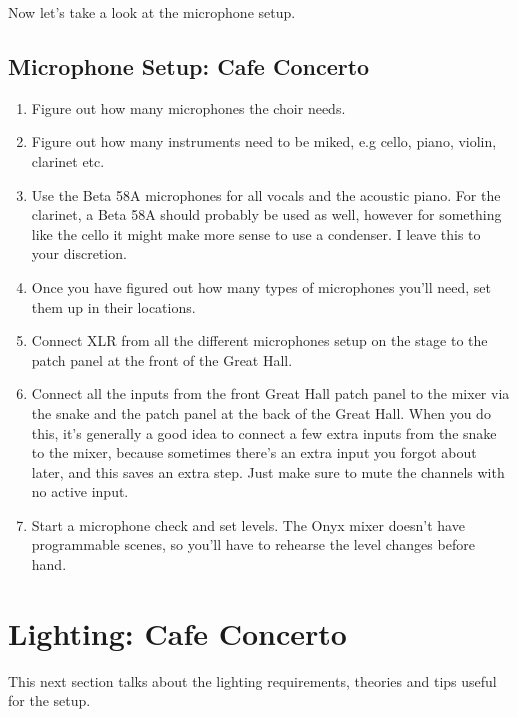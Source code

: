 \documentclass[11pt,a4paper]{book}
\begin{document}
\begin{enumerate}
Now let's take a look at the microphone setup.

\subsection{Microphone Setup: Cafe Concerto}

\begin{enumerate}
\item Figure out how many microphones the choir needs.
\item Figure out how many instruments need to be miked, e.g cello, piano, violin, clarinet etc.
\item Use the Beta 58A microphones for all vocals and the acoustic piano. For the clarinet, a Beta 58A should probably be used as well, however for something like the cello it might make more sense to use a condenser. I leave this to your discretion.
\item Once you have figured out how many types of microphones you'll need, set them up in their locations.
\item Connect XLR from all the different microphones setup on the stage to the patch panel at the front of the Great Hall.
\item Connect all the inputs from the front Great Hall patch panel to the mixer via the snake and the patch panel at the back of the Great Hall. When you do this, it's generally a good idea to connect a few extra inputs from the snake to the mixer, because sometimes there's an extra input you forgot about later, and this saves an extra step. Just make sure to mute the channels with no active input.
\item Start a microphone check and set levels. The Onyx mixer doesn't have programmable scenes, so you'll have to rehearse the level changes before hand.
\end{enumerate}
\section{Lighting: Cafe Concerto}
This next section talks about the lighting requirements, theories and tips useful for the setup.

\end{enumerate}
\end{document}
